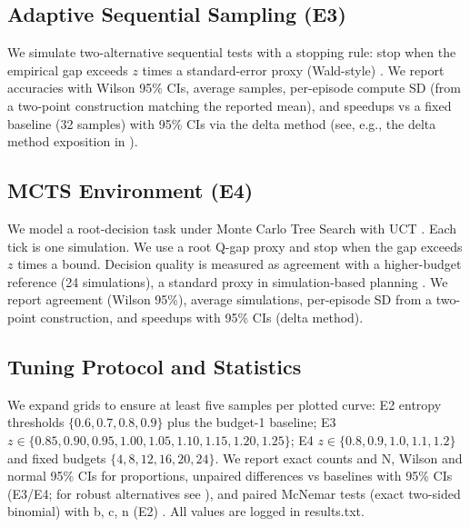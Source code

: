 \subsection{Adaptive Sequential Sampling (E3)}
We simulate two-alternative sequential tests with a stopping rule: stop when the empirical gap exceeds $z$ times a standard-error proxy (Wald-style) \cite{Wald1945Sequential}. We report accuracies with Wilson 95\% CIs, average samples, per-episode compute SD (from a two-point construction matching the reported mean), and speedups vs a fixed baseline (32 samples) with 95\% CIs via the delta method (see, e.g., the delta method exposition in \cite{CasellaBerger2002}).

\subsection{MCTS Environment (E4)}
We model a root-decision task under Monte Carlo Tree Search with UCT \cite{Kocsis2006UCT}. Each tick is one simulation. We use a root Q-gap proxy and stop when the gap exceeds $z$ times a bound. Decision quality is measured as agreement with a higher-budget reference (24 simulations), a standard proxy in simulation-based planning \cite{Coulom2006MCTS}. We report agreement (Wilson 95\%), average simulations, per-episode SD from a two-point construction, and speedups with 95\% CIs (delta method).

\subsection{Tuning Protocol and Statistics}
We expand grids to ensure at least five samples per plotted curve: E2 entropy thresholds $\{0.6,0.7,0.8,0.9\}$ plus the budget-1 baseline; E3 $z \in \{0.85,0.90,0.95,1.00,1.05,1.10,1.15,1.20,1.25\}$; E4 $z \in \{0.8,0.9,1.0,1.1,1.2\}$ and fixed budgets $\{4,8,12,16,20,24\}$. We report exact counts and N, Wilson and normal 95\% CIs for proportions, unpaired differences vs baselines with 95\% CIs (E3/E4; for robust alternatives see \cite{Newcombe1998Diff,Agresti2002}), and paired McNemar tests (exact two-sided binomial) with b, c, n (E2) \cite{McNemar1947}. All values are logged in results.txt.

